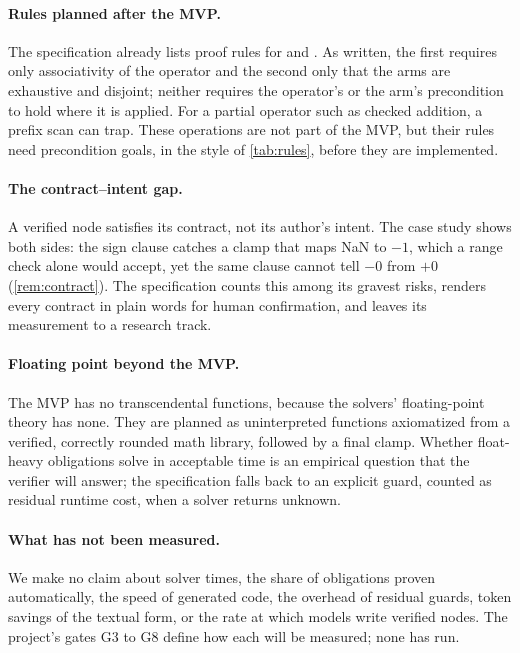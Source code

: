 \paragraph{Rules planned after the MVP.}
The specification already lists proof rules for  and .
As written, the first requires only associativity of the operator and the second only that the
arms are exhaustive and disjoint; neither requires the operator's or the arm's precondition to
hold where it is applied. For a partial operator such as checked addition, a prefix scan can
trap. These operations are not part of the MVP, but their rules need precondition goals, in the
style of \cref{tab:rules}, before they are implemented.

\paragraph{The contract--intent gap.}
A verified node satisfies its contract, not its author's intent. The case study shows both
sides: the sign clause catches a clamp that maps NaN to $-1$, which a range check alone would
accept, yet the same clause cannot tell $-0$ from $+0$ (\cref{rem:contract}). The specification
counts this among its gravest risks, renders every contract in plain words for human
confirmation, and leaves its measurement to a research track.

\paragraph{Floating point beyond the MVP.}
The MVP has no transcendental functions, because the solvers' floating-point theory has none.
They are planned as uninterpreted functions axiomatized from a verified, correctly rounded math
library, followed by a final clamp. Whether float-heavy obligations solve in acceptable time is
an empirical question that the verifier will answer; the specification falls back to an explicit
guard, counted as residual runtime cost, when a solver returns unknown.

\paragraph{What has not been measured.}
We make no claim about solver times, the share of obligations proven automatically, the speed of
generated code, the overhead of residual guards, token savings of the textual form, or the rate
at which models write verified nodes. The project's gates G3 to G8 define how each will be
measured; none has run.

